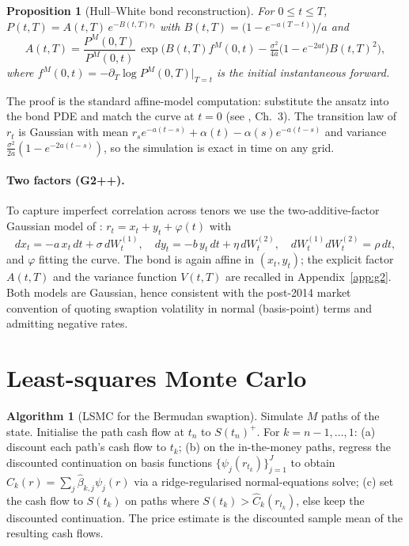 \documentclass[11pt]{article}
\theoremstyle{plain}
\newtheorem{proposition}{Proposition}
\theoremstyle{definition}
\newtheorem{algorithm}{Algorithm}
\begin{document}
\begin{proposition}[Hull--White bond reconstruction]
\label{prop:hw}
For $0\le t\le T$,
$P(t,T)=A(t,T)\,e^{-B(t,T)r_t}$ with $B(t,T)=\big(1-e^{-a(T-t)}\big)/a$ and
\[
A(t,T)=\frac{P^M(0,T)}{P^M(0,t)}\,
\exp\!\Big(B(t,T)f^M(0,t)-\tfrac{\sigma^2}{4a}\big(1-e^{-2at}\big)B(t,T)^2\Big),
\]
where $f^M(0,t)=-\partial_T\log P^M(0,T)|_{T=t}$ is the initial instantaneous forward.
\end{proposition}
\noindent The proof is the standard affine-model computation: substitute the ansatz into the
bond PDE and match the curve at $t=0$ (see \cite{BrigoMercurio2006}, Ch.~3). The transition law
of $r_t$ is Gaussian with mean $r_s e^{-a(t-s)}+\alpha(t)-\alpha(s)e^{-a(t-s)}$ and variance
$\tfrac{\sigma^2}{2a}(1-e^{-2a(t-s)})$, so the simulation is exact in time on any grid.

\paragraph{Two factors (G2++).} To capture imperfect correlation across tenors we use the
two-additive-factor Gaussian model of \cite{BrigoMercurio2006}: $r_t=x_t+y_t+\varphi(t)$ with
\[
dx_t=-a\,x_t\,dt+\sigma\,dW_t^{(1)},\quad
dy_t=-b\,y_t\,dt+\eta\,dW_t^{(2)},\quad
dW_t^{(1)}dW_t^{(2)}=\rho\,dt,
\]
and $\varphi$ fitting the curve. The bond is again affine in $(x_t,y_t)$; the explicit factor
$A(t,T)$ and the variance function $V(t,T)$ are recalled in Appendix~\ref{app:g2}. Both models
are Gaussian, hence consistent with the post-2014 market convention of quoting swaption
volatility in normal (basis-point) terms and admitting negative rates.

\section{Least-squares Monte Carlo}
\label{sec:lsmc}

\begin{algorithm}[LSMC for the Bermudan swaption]
\label{alg:lsmc}
Simulate $M$ paths of the state. Initialise the path cash flow at $t_n$ to $S(t_n)^+$. For
$k=n-1,\dots,1$: (a) discount each path's cash flow to $t_k$; (b) on the in-the-money paths,
regress the discounted continuation on basis functions $\{\psi_j(r_{t_k})\}_{j=1}^{J}$ to obtain
$\hat C_k(r)=\sum_j\hat\beta_{k,j}\psi_j(r)$ via a ridge-regularised normal-equations solve;
(c) set the cash flow to $S(t_k)$ on paths where $S(t_k)>\hat C_k(r_{t_k})$, else keep the
discounted continuation. The price estimate is the discounted sample mean of the resulting cash
flows.
\end{algorithm}
\end{document}

